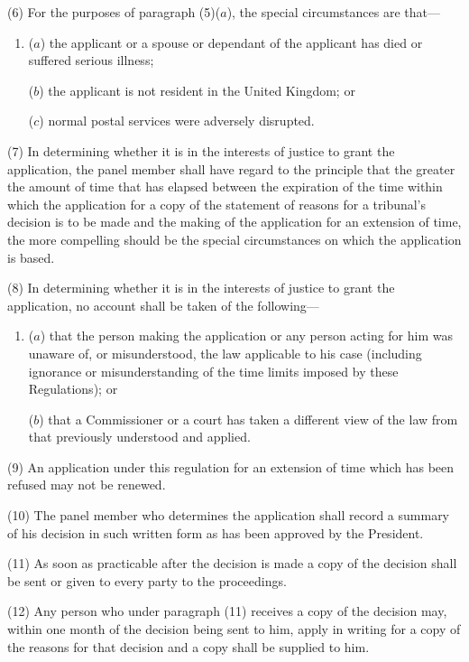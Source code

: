 \documentclass[12pt,a4paper]{article}
\begin{document}
(6) For the purposes of paragraph (5)($a$), the special circumstances are that—
\begin{enumerate}\item[]
($a$) the applicant or a spouse or dependant of the applicant has died or suffered serious illness;

($b$) the applicant is not resident in the United Kingdom; or

($c$) normal postal services were adversely disrupted.
\end{enumerate}

(7) In determining whether it is in the interests of justice to grant the application, the panel member shall have regard to the principle that the greater the amount of time that has elapsed between the expiration of the time within which the application for a copy of the statement of reasons for a tribunal’s decision is to be made and the making of the application for an extension of time, the more compelling should be the special circumstances on which the application is based.

(8) In determining whether it is in the interests of justice to grant the application, no account shall be taken of the following—
\begin{enumerate}\item[]
($a$) that the person making the application or any person acting for him was unaware of, or misunderstood, the law applicable to his case (including ignorance or misunderstanding of the time limits imposed by these Regulations); or

($b$) that a Commissioner or a court has taken a different view of the law from that previously understood and applied.
\end{enumerate}

(9) An application under this regulation for an extension of time which has been refused may not be renewed.

(10) The panel member who determines the application shall record a summary of his decision in such written form as has been approved by the President.

(11) As soon as practicable after the decision is made a copy of the decision shall be sent or given to every party to the proceedings.

(12) Any person who under paragraph (11) receives a copy of the decision may, within one month of the decision being sent to him, apply in writing for a copy of the reasons for that decision and a copy shall be supplied to him.
\end{document}
